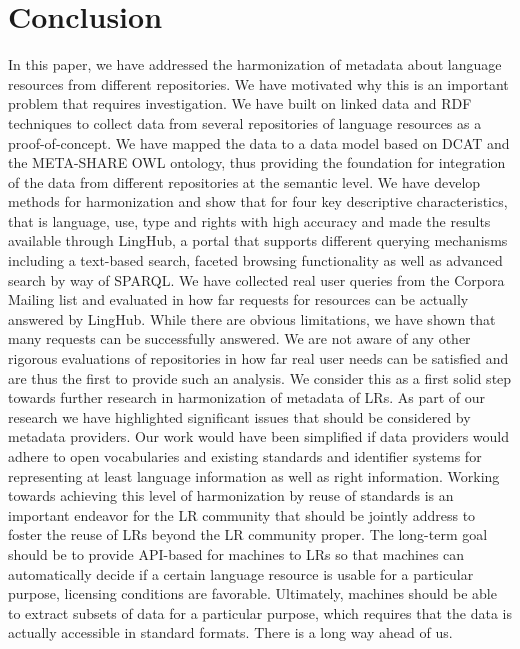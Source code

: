 \documentclass[smallextended]{svjour3}       %
\begin{document}
\section{Conclusion}
\label{conclusion}

In this paper, we have addressed the harmonization of metadata about language
resources from different repositories. We have motivated why this is an
important problem that requires investigation.  We have built on linked data and
RDF techniques to collect data from several repositories of language resources
as a proof-of-concept. We have mapped the data to a data model based on DCAT and
the META-SHARE OWL ontology, thus providing the foundation for integration of
the data from different repositories at the semantic level. We have develop
methods for harmonization and show that for four key descriptive
characteristics, that is language, use, type and rights with high accuracy and 
made the results available through LingHub, a portal that supports
different querying mechanisms including a text-based search, faceted browsing
functionality as well as advanced search by way of SPARQL.  We have collected
real user queries from the Corpora Mailing list and evaluated in how far
requests for resources can be actually answered by LingHub. While there are
obvious limitations, we have shown that many requests can be successfully
answered.  We are not aware of any other rigorous evaluations of repositories in
how far real user needs can be satisfied and are thus the first to provide such
an analysis. We consider this as a first solid step towards further research in
harmonization of metadata of LRs. As part of our research we have highlighted
significant issues that should be considered by metadata providers. Our work
would have been simplified if data providers would adhere to open vocabularies
and existing standards and identifier systems for representing at least language
information as well as right information. Working towards achieving this level
of harmonization by reuse of standards is an important endeavor for the LR
community that should be jointly address to foster the reuse of LRs beyond the
LR community proper. The long-term goal should be to provide API-based for
machines to LRs so that machines can automatically decide if a certain language
resource is usable for a particular purpose, licensing conditions are favorable.
Ultimately, machines should be able to extract subsets of data for a particular
purpose, which requires that the data is actually accessible in standard
formats. There is a long way ahead of us.  
\end{document}
